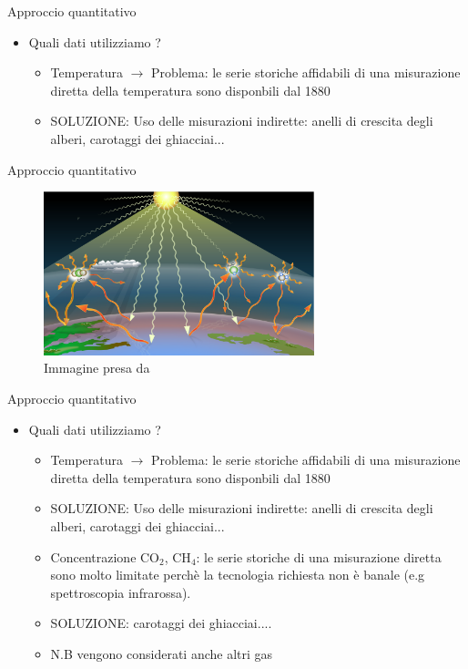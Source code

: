 \documentclass{beamer}
\begin{document}
\begin{frame}{Approccio quantitativo}
\begin{itemize}
\item Quali dati utilizziamo ? 
\begin{itemize}
\item Temperatura  $\rightarrow$ Problema: le serie storiche affidabili di una misurazione diretta della temperatura sono disponbili dal 1880 \cite{1880}
\item SOLUZIONE: Uso delle misurazioni indirette: anelli di crescita degli alberi, carotaggi dei ghiacciai...
\end{itemize}
\end{itemize}
\end{frame}


\begin{frame}{Approccio quantitativo}
\begin{figure}
\begin{center}
\includegraphics[width=0.7\textwidth ]{Pic/1920px-Greenhouse-effect-t2.png}
\caption{Immagine presa da \cite{wiki}}
\end{center}
\end{figure}
\end{frame}

\begin{frame}{Approccio quantitativo}
\begin{itemize}
\item Quali dati utilizziamo ? 
\begin{itemize}
\item Temperatura  $\rightarrow$ Problema: le serie storiche affidabili di una misurazione diretta della temperatura sono disponbili dal 1880 \cite{1880}
\item SOLUZIONE: Uso delle misurazioni indirette: anelli di crescita degli alberi, carotaggi dei ghiacciai...
\item Concentrazione CO$_{2}$, CH$_{4}$: le serie storiche di una misurazione diretta sono molto limitate perchè la tecnologia richiesta non è banale (e.g spettroscopia infrarossa). 
\item SOLUZIONE: carotaggi dei ghiacciai....
\item N.B vengono considerati anche altri gas
\end{itemize}
\end{itemize}
\end{frame}
\end{document}
